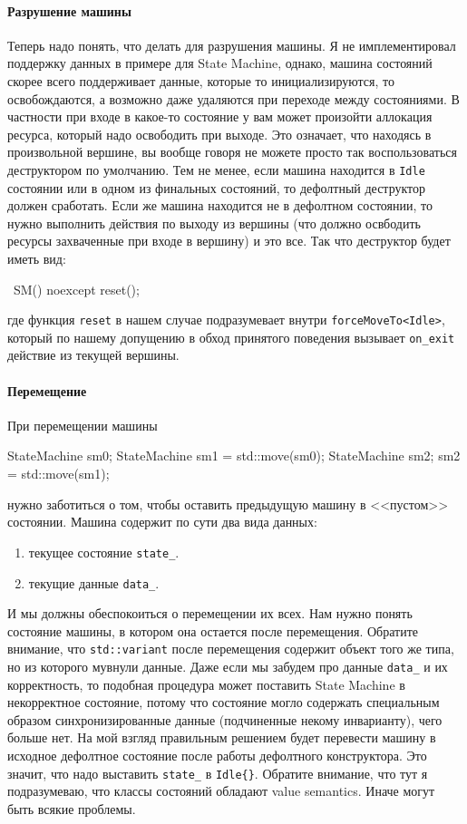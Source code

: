 \documentclass{article}
\begin{document}
{\paragraph{Разрушение машины}

Теперь надо понять, что делать для разрушения машины.
Я не имплементировал поддержку данных в примере для State Machine, однако, машина состояний скорее всего поддерживает данные, которые то инициализируются, то освобождаются, а возможно даже удаляются при переходе между состояниями.
В частности при входе в какое-то состояние у вам может произойти аллокация ресурса, который надо освободить при выходе.
Это означает, что находясь в произвольной вершине, вы  вообще говоря не можете просто так воспользоваться деструктором по умолчанию.
Тем не менее, если машина находится в \verb"Idle" состоянии или в одном из финальных состояний, то дефолтный деструктор должен сработать.
Если же машина находится не в дефолтном состоянии, то нужно выполнить действия по выходу из вершины (что должно освбодить ресурсы захваченные при входе в вершину) и это все.
Так что деструктор будет иметь вид:
\begin{cppcode}
~SM() noexcept {
  reset();
}
\end{cppcode}
где функция \verb"reset" в нашем случае подразумевает внутри \verb"forceMoveTo<Idle>", который по нашему допущению в обход принятого поведения вызывает \verb"on_exit" действие из текущей вершины.

\paragraph{Перемещение}

При перемещении машины
\begin{cppcode}
StateMachine sm0;
StateMachine sm1 = std::move(sm0);
StateMachine sm2;
sm2 = std::move(sm1);
\end{cppcode}
нужно заботиться о том, чтобы оставить предыдущую машину в <<пустом>> состоянии.
Машина содержит по сути два вида данных:
\begin{enumerate}
\item текущее состояние \verb"state_".

\item текущие данные \verb"data_".
\end{enumerate}
И мы должны обеспокоиться о перемещении их всех.
Нам нужно понять состояние машины, в котором она остается после перемещения.
Обратите внимание, что \verb"std::variant" после перемещения содержит объект того же типа, но из которого мувнули данные.
Даже если мы забудем про данные \verb"data_" и их корректность, то подобная процедура может поставить State Machine в некорректное состояние, потому что состояние могло содержать специальным образом синхронизированные данные (подчиненные некому инварианту), чего больше нет.
На мой взгляд правильным решением будет перевести машину в исходное дефолтное состояние после работы дефолтного конструктора.
Это значит, что надо выставить \verb"state_" в \verb"Idle{}".
Обратите внимание, что тут я подразумеваю, что классы состояний обладают value semantics.
Иначе могут быть всякие проблемы.

}
\end{document}
